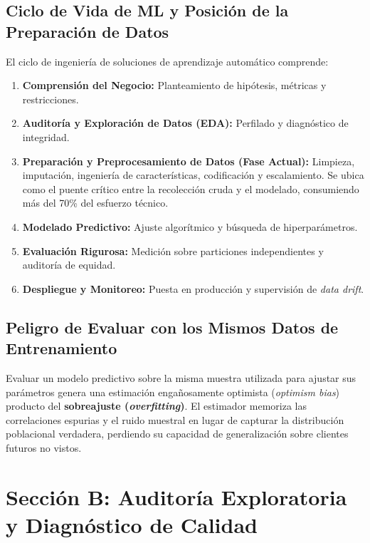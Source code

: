 \documentclass[12pt,a4paper]{article}
\begin{document}
\subsection{Ciclo de Vida de ML y Posición de la Preparación de Datos}
El ciclo de ingeniería de soluciones de aprendizaje automático comprende:
\begin{enumerate}[noitemsep]
    \item \textbf{Comprensión del Negocio:} Planteamiento de hipótesis, métricas y restricciones.
    \item \textbf{Auditoría y Exploración de Datos (EDA):} Perfilado y diagnóstico de integridad.
    \item \textbf{Preparación y Preprocesamiento de Datos (Fase Actual):} Limpieza, imputación, ingeniería de características, codificación y escalamiento. Se ubica como el puente crítico entre la recolección cruda y el modelado, consumiendo más del 70\% del esfuerzo técnico.
    \item \textbf{Modelado Predictivo:} Ajuste algorítmico y búsqueda de hiperparámetros.
    \item \textbf{Evaluación Rigurosa:} Medición sobre particiones independientes y auditoría de equidad.
    \item \textbf{Despliegue y Monitoreo:} Puesta en producción y supervisión de \textit{data drift}.
\end{enumerate}

\subsection{Peligro de Evaluar con los Mismos Datos de Entrenamiento}
Evaluar un modelo predictivo sobre la misma muestra utilizada para ajustar sus parámetros genera una estimación engañosamente optimista (\textit{optimism bias}) producto del \textbf{sobreajuste (\textit{overfitting})}. El estimador memoriza las correlaciones espurias y el ruido muestral en lugar de capturar la distribución poblacional verdadera, perdiendo su capacidad de generalización sobre clientes futuros no vistos.

\section{Sección B: Auditoría Exploratoria y Diagnóstico de Calidad}
\end{document}
